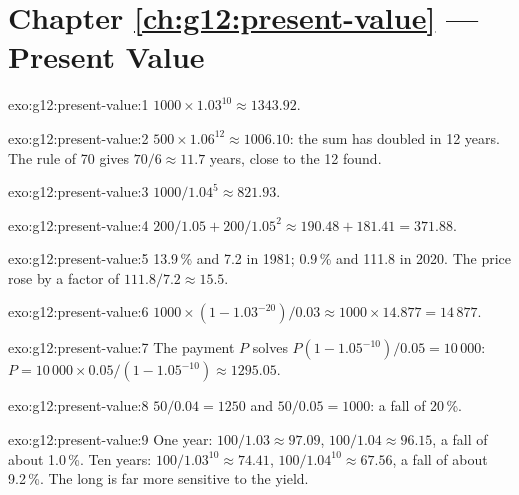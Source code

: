 \section*{Chapter \ref{ch:g12:present-value} --- Present Value}

\begin{solution}{exo:g12:present-value:1}
$1000 \times 1.03^{10} \approx 1343.92$.
\end{solution}

\begin{solution}{exo:g12:present-value:2}
$500 \times 1.06^{12} \approx 1006.10$: the sum has doubled in 12 years. The rule of 70 gives $70/6 \approx 11.7$ years, close to the 12 found.
\end{solution}

\begin{solution}{exo:g12:present-value:3}
$1000/1.04^5 \approx 821.93$.
\end{solution}

\begin{solution}{exo:g12:present-value:4}
$200/1.05 + 200/1.05^2 \approx 190.48 + 181.41 = 371.88$.
\end{solution}

\begin{solution}{exo:g12:present-value:5}
13.9\,\% and 7.2 in 1981; 0.9\,\% and 111.8 in 2020. The price rose by a factor of $111.8/7.2 \approx 15.5$.
\end{solution}

\begin{solution}{exo:g12:present-value:6}
$1000 \times (1 - 1.03^{-20})/0.03 \approx 1000 \times 14.877 = 14\,877$.
\end{solution}

\begin{solution}{exo:g12:present-value:7}
The payment $P$ solves $P(1 - 1.05^{-10})/0.05 = 10\,000$: $P = 10\,000 \times 0.05/(1 - 1.05^{-10}) \approx 1295.05$.
\end{solution}

\begin{solution}{exo:g12:present-value:8}
$50/0.04 = 1250$ and $50/0.05 = 1000$: a fall of 20\,\%.
\end{solution}

\begin{solution}{exo:g12:present-value:9}
One year: $100/1.03 \approx 97.09$, $100/1.04 \approx 96.15$, a fall of about 1.0\,\%. Ten years: $100/1.03^{10} \approx 74.41$, $100/1.04^{10} \approx 67.56$, a fall of
about 9.2\,\%. The long  is far more sensitive to the yield.
\end{solution}

